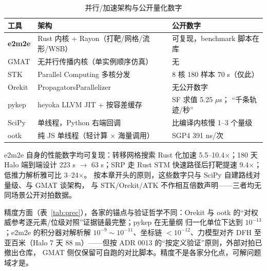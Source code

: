 \begin{table}[htbp]
\centering\small
\caption{并行/加速架构与公开量化数字}
\label{tab:perf}
\begin{tabularx}{\textwidth}{@{}lXl@{}}
\toprule
\textbf{工具} & \textbf{架构} & \textbf{公开数字} \\
\midrule
\textbf{e2m2e} & Rust 内核 + Rayon（打靶/网格/流形/WSB） &
可复现，benchmark 脚本在库 \\
GMAT & 无并行传播内核（单实例顺序仿真） & 无 \\
STK & Parallel Computing 多核分发 & 8 核 180 样本 70 s（仅此） \\
Orekit & PropagatorsParallelizer & 无公开数字 \\
pykep & heyoka LLVM JIT + 按容差缓存 & SF 求值 5.25 $\mu$s；
``千条轨迹/秒'' \\
SciPy & 单线程，Python 右端回调 & 比编译内核慢 1--3 个量级 \\
ootk & 纯 JS 单线程（轻计算 $\times$ 海量调用） & SGP4 391 ns/次 \\
\bottomrule
\end{tabularx}
\end{table}

e2m2e 自身的性能数字均可复现：转移网格搜索 Rust 化加速
5.5--10.4$\times$；180 天 Halo 端到端设计 223 s $\to$ 63 s；SRP 走
Rust STM 快速路径后打靶提速 9.4$\times$；低推力解析雅可比 3--24$\times$。
按本章开头的原则，这些数字只与 SciPy 自建路线对量级、与 GMAT 谈架构，
与 STK/Orekit/ATK 不作相互倍数声明——三者均无同场景公开对拍数据。

精度方面（表~\ref{tab:prec}），各家的锚点与验证哲学不同：Orekit 与
ootk 的``对权威参考逐元素/位级对照''证据链最完整；pykep 在无量纲
归一化单位下达到 $10^{-13}$；e2m2e 的积分器对解析解 $10^{-9}\sim
10^{-11}$、坐标链 $<10^{-12}$、力模型对齐 DFH 至亚百米（Halo 7 天
88 m）——但按 ADR 0013 的``按定义验证''原则，外部对拍已撤出仓库，
 GMAT 侧仅保留可自跑的对比脚本。精度不是各家分化点，可解问题域才是。

